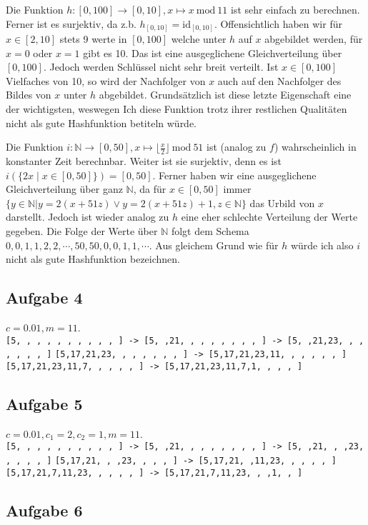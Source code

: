 \documentclass[a4paper,graphics,11pt]{article}
\newcommand{\aufgabe}[1]{\subsection*{Aufgabe #1}}
\begin{document}
Die Funktion $h:[0, 100] \to [0,10], x \mapsto x\ \text{mod}\ 11$ ist sehr einfach zu berechnen. Ferner ist es surjektiv, da
z.b. $h_{[0,10]} = \text{id}_{[0,10]}$. Offensichtlich haben wir für $x \in [2,10]$ stets 9 werte in $[0,100]$ welche
unter $h$ auf $x$ abgebildet werden, für $x = 0$ oder $x=1$ gibt es 10. Das ist eine ausgeglichene Gleichverteilung über
$[0,100]$. Jedoch werden Schlüssel nicht sehr breit verteilt. Ist $x \in [0,100]$ Vielfaches von 10, so wird der Nachfolger
von $x$ auch auf den Nachfolger des Bildes von $x$ unter $h$ abgebildet. Grundsätzlich ist diese letzte Eigenschaft eine
der wichtigsten, weswegen Ich diese Funktion trotz ihrer restlichen Qualitäten nicht als gute Hashfunktion betiteln würde.

\newpage

Die Funktion $i: \mathbb{N} \to [0,50], x \mapsto \lfloor \frac{x}{2} \rfloor\ \text{mod}\ 51$ ist (analog zu $f$) wahrscheinlich
in konstanter Zeit berechnbar. Weiter ist sie surjektiv, denn
es ist $i(\{2x \mid x \in [0,50]\}) = [0,50]$. Ferner haben wir eine ausgeglichene Gleichverteilung über ganz $\mathbb{N}$,
da für $x \in [0,50]$ immer\\ $\{y \in \mathbb{N}| y=2(x+51z) \lor y=2(x+51z)+1, z \in \mathbb{N}\}$ das Urbild
von $x$ darstellt. Jedoch ist wieder analog zu $h$ eine eher schlechte Verteilung der Werte gegeben. Die Folge der Werte
über $\mathbb{N}$ folgt dem Schema $0,0,1,1,2,2,\cdots,50,50,0,0,1,1,\cdots$. Aus gleichem Grund wie für $h$ würde ich
also $i$ nicht als gute Hashfunktion bezeichnen.

\aufgabe{4}
$c = 0.01, m = 11$.\\
\texttt{[5, , , , , , , , , , ] -> [5, ,21, , , , , , , , ] -> [5, ,21,23, , , , , , , ]}
\texttt{[5,17,21,23, , , , , , , ] -> [5,17,21,23,11, , , , , , ]}\\
\texttt{[5,17,21,23,11,7, , , , , ] -> [5,17,21,23,11,7,1, , , , ]}

\aufgabe{5}
$c = 0.01, c_1 = 2, c_2 =1, m = 11$.\\
\texttt{[5, , , , , , , , , , ] -> [5, ,21, , , , , , , , ] -> [5, ,21, , ,23, , , , , ]}
\texttt{[5,17,21, , ,23, , , , ] -> [5,17,21, ,11,23, , , , , ]}\\
\texttt{[5,17,21,7,11,23, , , , , ] -> [5,17,21,7,11,23, , ,1, , ]}

\aufgabe{6}


\end{document}
